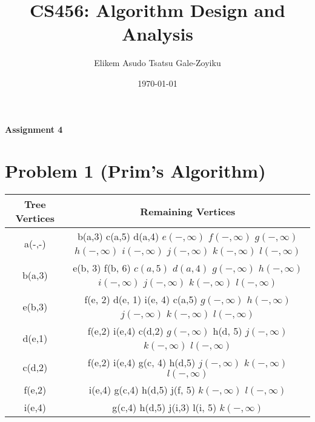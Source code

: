 \documentclass{article}
\title{\textbf{CS456: Algorithm Design and Analysis}}
\author{Elikem Asudo Tsatsu Gale-Zoyiku}
\date{\today}
\begin{document}
\maketitle
\begin{center}
    \begin{large}
        \textbf{Assignment 4\\}
    \end{large}
\end{center}
\newpage

\section*{Problem 1 (Prim's Algorithm)}
\begin{table}[ht]
    \centering
    \begin{tabular}{|c|c|}
        \hline
        \textbf{Tree Vertices} & \textbf{Remaining Vertices}                                                                                                          \\
        \hline
        a(-,-)                 & b(a,3) c(a,5) d(a,4) $e(-,\infty)$ $f(-,\infty)$ $g(-,\infty)$ $h(-,\infty)$ $i(-,\infty)$ $j(-,\infty)$ $k(-,\infty)$ $l(-,\infty)$ \\
        \hline
        b(a,3)                 & e(b, 3) f(b, 6) $c(a,5)$ $d(a,4)$ $g(-,\infty)$ $h(-,\infty)$ $i(-,\infty)$ $j(-,\infty)$ $k(-,\infty)$ $l(-,\infty)$                \\
        \hline
        e(b,3)                 & f(e, 2) d(e, 1) i(e, 4) c(a,5) $g(-,\infty)$ $h(-,\infty)$ $j(-,\infty)$ $k(-,\infty)$ $l(-,\infty)$                                 \\
        \hline
        d(e,1)                 & f(e,2) i(e,4) c(d,2) $g(-,\infty)$ h(d, 5) $j(-,\infty)$ $k(-,\infty)$ $l(-,\infty)$                                                 \\
        \hline
        c(d,2)                 & f(e,2) i(e,4) g(c, 4) h(d,5) $j(-,\infty)$ $k(-,\infty)$ $l(-,\infty)$                                                               \\
        \hline
        f(e,2)                 & i(e,4) g(c,4) h(d,5) j(f, 5) $k(-,\infty)$ $l(-,\infty)$                                                                             \\
        \hline
        i(e,4)                 & g(c,4) h(d,5) j(i,3) l(i, 5) $k(-,\infty)$                                                                                           \\

\end{tabular}
\end{table}
\end{document}
